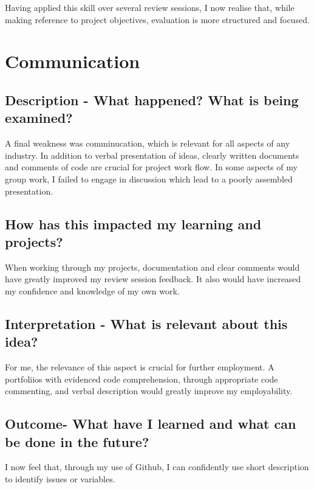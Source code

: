 \documentclass{scrartcl}
\begin{document}
Having applied this skill over several review sessions, I now realise that, while making reference to project objectives, evaluation is more structured and focused.

\section{Communication}

\subsection{Description - What happened? What is being examined?}

A final weakness was comminucation, which is relevant for all aspects of any industry. In addition to verbal presentation of ideas, clearly written documents and comments of code are crucial for project work flow. In some aspects of my group work, I failed to engage in discussion which lead to a poorly assembled presentation.

\subsection{How has this impacted my learning and projects?}

When working through my projects, documentation and clear comments would have greatly improved my review session feedback. It also would have increased my confidence and knowledge of my own work.

\subsection{Interpretation - What is relevant about this idea?}

For me, the relevance of this aspect is crucial for further employment. A portfoliios with evidenced code comprehension, through appropriate code commenting, and verbal description would greatly improve my employability.

\subsection{Outcome- What have I learned and what can be done in the future?}

I now feel that, through my use of Github, I can confidently use short description to identify issues or variables.

%
%
\end{document}

